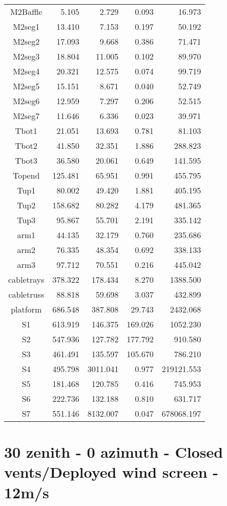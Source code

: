 \begin{longtable}{crrrr}
 M2Baffle & 5.105 & 2.729 & 0.093 & 16.973 \\
 M2seg1 & 13.410 & 7.153 & 0.197 & 50.192 \\
 M2seg2 & 17.093 & 9.668 & 0.386 & 71.471 \\
 M2seg3 & 18.804 & 11.005 & 0.102 & 89.970 \\
 M2seg4 & 20.321 & 12.575 & 0.074 & 99.719 \\
 M2seg5 & 15.151 & 8.671 & 0.040 & 52.749 \\
 M2seg6 & 12.959 & 7.297 & 0.206 & 52.515 \\
 M2seg7 & 11.646 & 6.336 & 0.023 & 39.971 \\
 Tbot1 & 21.051 & 13.693 & 0.781 & 81.103 \\
 Tbot2 & 41.850 & 32.351 & 1.886 & 288.823 \\
 Tbot3 & 36.580 & 20.061 & 0.649 & 141.595 \\
 Topend & 125.481 & 65.951 & 0.991 & 455.795 \\
 Tup1 & 80.002 & 49.420 & 1.881 & 405.195 \\
 Tup2 & 158.682 & 80.282 & 4.179 & 481.365 \\
 Tup3 & 95.867 & 55.701 & 2.191 & 335.142 \\
 arm1 & 44.135 & 32.179 & 0.760 & 235.686 \\
 arm2 & 76.335 & 48.354 & 0.692 & 338.133 \\
 arm3 & 97.712 & 70.551 & 0.216 & 445.042 \\
 cabletrays & 378.322 & 178.434 & 8.270 & 1388.500 \\
 cabletruss & 88.818 & 59.698 & 3.037 & 432.899 \\
 platform & 686.548 & 387.808 & 29.743 & 2432.068 \\
 S1 & 613.919 & 146.375 & 169.026 & 1052.230 \\
 S2 & 547.936 & 127.782 & 177.792 & 910.580 \\
 S3 & 461.491 & 135.597 & 105.670 & 786.210 \\
 S4 & 495.798 & 3011.041 & 0.977 & 219121.553 \\
 S5 & 181.468 & 120.785 & 0.416 & 745.953 \\
 S6 & 222.736 & 132.188 & 0.810 & 631.717 \\
 S7 & 551.146 & 8132.007 & 0.047 & 678068.197 \\
\bottomrule
\end{longtable}




\section{30 zenith - 0 azimuth - Closed vents/Deployed wind screen - 12m/s}
\label{zen30az000_CD12}

